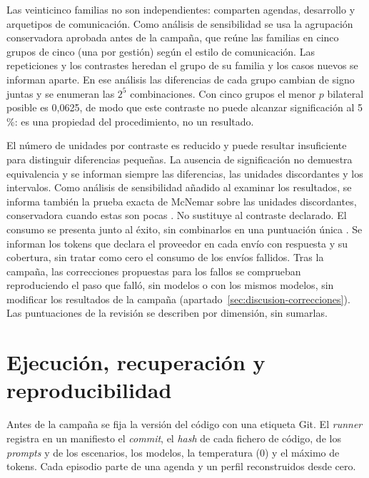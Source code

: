 Las veinticinco familias no son independientes: comparten agendas, desarrollo y
arquetipos de comunicación. Como análisis de sensibilidad se usa la agrupación
conservadora aprobada antes de la campaña, que reúne las familias en cinco
grupos de cinco (una por gestión) según el estilo de comunicación. Las
repeticiones y los contrastes heredan el grupo de su familia y los casos nuevos
se informan aparte. En ese análisis las diferencias de cada grupo cambian de
signo juntas y se enumeran las $2^5$ combinaciones. Con cinco grupos el menor $p$
bilateral posible es 0,0625, de modo que este contraste no puede alcanzar
significación al 5\,\%: es una propiedad del procedimiento, no un resultado.

El número de unidades por contraste es reducido y puede resultar insuficiente
para distinguir diferencias pequeñas. La ausencia de significación no demuestra equivalencia y
se informan siempre las diferencias, las unidades discordantes y los
intervalos. Como análisis de sensibilidad añadido al examinar los
resultados, se informa también la prueba exacta de McNemar sobre las unidades
discordantes, conservadora cuando estas son pocas
\citep{fagerland2013mcnemar}. No sustituye al contraste declarado. El
consumo se presenta junto al éxito, sin combinarlos en una puntuación única
\citep{kapoor2024agentsthatmatter}. Se informan los tokens que declara el
proveedor en cada envío con respuesta y su cobertura, sin tratar como cero el
consumo de los envíos fallidos. Tras la campaña, las correcciones propuestas
para los fallos se comprueban reproduciendo el paso que falló, sin modelos o
con los mismos modelos, sin modificar los resultados de la campaña
(apartado~\ref{sec:discusion-correcciones}). Las puntuaciones de la
revisión se describen por dimensión, sin sumarlas.

\section{Ejecución, recuperación y reproducibilidad}
\label{sec:metodo-ejecucion}

Antes de la campaña se fija la versión del código con una etiqueta Git. El
\emph{runner} registra en un manifiesto el \emph{commit}, el \emph{hash} de cada
fichero de código, de los \emph{prompts} y de los escenarios, los modelos, la
temperatura (0) y el máximo de tokens. Cada episodio parte de una agenda y un perfil reconstruidos desde
cero.

